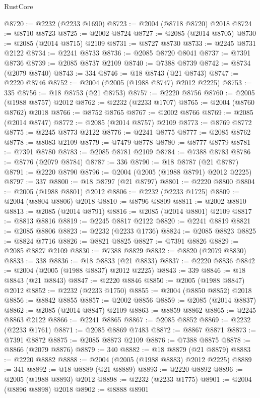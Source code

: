 \begin{lexlean}{RustCore}
\begin{coremodule}
@8720 := @2232 (@2233 @1690)
@8723 := @2004 (@8718 @8720) @2018
@8724 := @8710 @8723
@8725 := @2002 @8724
@8727 := @2085 (@2014 @8705)
@8730 := @2085 (@2014 @8715) @2109
@8731 := @8727 @8730
@8733 := @2245 @8731 @2122
@8734 := @2241 @8733
@8736 := @2085 @8720 @8041
@8737 := @7391 @8736
@8739 := @2085 @8737 @2109
@8740 := @7388 @8739
@8742 := @8734 (@2079 @8740)
@8743 := 334
@8746 := @18 @8743 (@21 @8743)
@8747 := @2220 @8746
@8752 := @2004 (@2005 (@1988 @8747) @2012 @2225)
@8753 := 335
@8756 := @18 @8753 (@21 @8753)
@8757 := @2220 @8756
@8760 := @2005 (@1988 @8757) @2012
@8762 := @2232 (@2233 @1707)
@8765 := @2004 (@8760 @8762) @2018
@8766 := @8752 @8765
@8767 := @2002 @8766
@8769 := @2085 (@2014 @8747)
@8772 := @2085 (@2014 @8757) @2109
@8773 := @8769 @8772
@8775 := @2245 @8773 @2122
@8776 := @2241 @8775
@8777 := @2085 @8762
@8778 := @8083 @2109
@8779 := @7479 @8778
@8780 := @8777 @8779
@8781 := @7391 @8780
@8783 := @2085 @8781 @2109
@8784 := @7388 @8783
@8786 := @8776 (@2079 @8784)
@8787 := 336
@8790 := @18 @8787 (@21 @8787)
@8791 := @2220 @8790
@8796 := @2004 (@2005 (@1988 @8791) @2012 @2225)
@8797 := 337
@8800 := @18 @8797 (@21 @8797)
@8801 := @2220 @8800
@8804 := @2005 (@1988 @8801) @2012
@8806 := @2232 (@2233 @1725)
@8809 := @2004 (@8804 @8806) @2018
@8810 := @8796 @8809
@8811 := @2002 @8810
@8813 := @2085 (@2014 @8791)
@8816 := @2085 (@2014 @8801) @2109
@8817 := @8813 @8816
@8819 := @2245 @8817 @2122
@8820 := @2241 @8819
@8821 := @2085 @8806
@8823 := @2232 (@2233 @1736)
@8824 := @2085 @8823
@8825 := @8824 @7716
@8826 := @8821 @8825
@8827 := @7391 @8826
@8829 := @2085 @8827 @2109
@8830 := @7388 @8829
@8832 := @8820 (@2079 @8830)
@8833 := 338
@8836 := @18 @8833 (@21 @8833)
@8837 := @2220 @8836
@8842 := @2004 (@2005 (@1988 @8837) @2012 @2225)
@8843 := 339
@8846 := @18 @8843 (@21 @8843)
@8847 := @2220 @8846
@8850 := @2005 (@1988 @8847) @2012
@8852 := @2232 (@2233 @1750)
@8855 := @2004 (@8850 @8852) @2018
@8856 := @8842 @8855
@8857 := @2002 @8856
@8859 := @2085 (@2014 @8837)
@8862 := @2085 (@2014 @8847) @2109
@8863 := @8859 @8862
@8865 := @2245 @8863 @2122
@8866 := @2241 @8865
@8867 := @2085 @8852
@8869 := @2232 (@2233 @1761)
@8871 := @2085 @8869 @7483
@8872 := @8867 @8871
@8873 := @7391 @8872
@8875 := @2085 @8873 @2109
@8876 := @7388 @8875
@8878 := @8866 (@2079 @8876)
@8879 := 340
@8882 := @18 @8879 (@21 @8879)
@8883 := @2220 @8882
@8888 := @2004 (@2005 (@1988 @8883) @2012 @2225)
@8889 := 341
@8892 := @18 @8889 (@21 @8889)
@8893 := @2220 @8892
@8896 := @2005 (@1988 @8893) @2012
@8898 := @2232 (@2233 @1775)
@8901 := @2004 (@8896 @8898) @2018
@8902 := @8888 @8901

\end{coremodule}
\end{lexlean}
